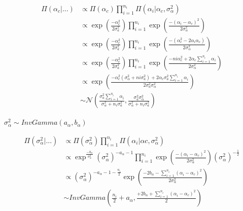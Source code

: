\documentclass[
]{article}
\begin{document}
\begin{align*}
\Pi(\alpha_{c}|...) &\propto \Pi(\alpha_{c}) \prod_{i=1}^{n_{i}} \Pi(\alpha_{i}|\alpha_{c},\sigma_{\alpha}^{2} ) \\
        &\propto \exp\left(\frac{-\alpha_{c}^{2}}{2\sigma_{a}^{2}}\right)\prod_{i=1}^{n_{i}} \exp\left(\frac{-(\alpha_{i}-\alpha_{c})^{2}}{2\sigma_{\alpha}^{2}}\right) \\
        &\propto \exp\left(\frac{-\alpha_{c}^{2}}{2\sigma_{a}^{2}}\right)\prod_{i=1}^{n_{i}} \exp\left(\frac{-(\alpha_{c}^{2}-2\alpha_{i}\alpha_{c})}{2\sigma_{\alpha}^{2}}\right) \\
        &\propto \exp\left(\frac{-\alpha_{c}^{2}}{2\sigma_{a}^{2}}\right)\prod_{i=1}^{n_{i}} \exp\left(\frac{-ni\alpha_{c}^{2}+2\alpha_{c}\sum\limits_{i=1}^{n_{i}} \alpha_{i}}{2\sigma_{\alpha}^{2}}\right)\\
        &\propto \exp\left(\frac{-\alpha_{c}^{2}(\sigma_{\alpha}^{2}+ni\sigma_{a}^{2}) +2\alpha_{c}\sigma_{a}^{2}\sum\limits_{i=1}^{n_{i}} \alpha_{i}}{2\sigma_{a}^{2}\sigma_{\alpha}^{2}}\right)\\
        &\sim \mathcal{N}\left(\frac{\sigma_{a}^{2}\sum\limits_{i=1}^{n_{i}} \alpha_{i}}{\sigma_{\alpha}^{2}+n_{i}\sigma_{a}^{2}},\frac{\sigma_{a}^{2}\sigma_{\alpha}^{2}}{\sigma_{\alpha}^{2}+n_{i}\sigma_{a}^{2}}\right)
\end{align*}

\(\sigma_{\alpha}^{2} \sim InvGamma(a_{\alpha},b_{\alpha})\)

\begin{align}
\Pi(\sigma_{\alpha}^{2}|...) &\propto \Pi(\sigma_{\alpha}^{2}) \prod_{i=1}^{n_{i}}\Pi(\alpha_{i}|\alpha{c},\sigma_{\alpha}^{2}) \\
&\propto \exp^{\frac{-b_{\alpha}}{\sigma_{\alpha}^{2}}}(\sigma_{\alpha}^{2})^{-a_{\alpha}-1}\prod_{i=1}^{n_{i}} \exp\left(\frac{-(\alpha_{i}-\alpha_{c})^{2}}{2\sigma_{\alpha}^{2}}\right)(\sigma_{\alpha}^{2})^{-\frac{1}{2}}\\
&\propto (\sigma_{\alpha}^{2})^{-a_{\alpha}-1-\frac{n_{i}}{2}}\exp\left(\frac{-2b_{\alpha}-\sum\limits_{i=1}^{n_{i}}(\alpha_{i}-\alpha_{c})^{2}}{2\sigma_{\alpha}^{2}}\right)\\
&\sim InvGamma(\frac{n_{i}}{2}+a_{\alpha},\frac{+2b_{\alpha}+\sum\limits_{i=1}^{n_{i}}(\alpha_{i}-\alpha_{c})^{2}}{2})
\end{align}
\end{document}
